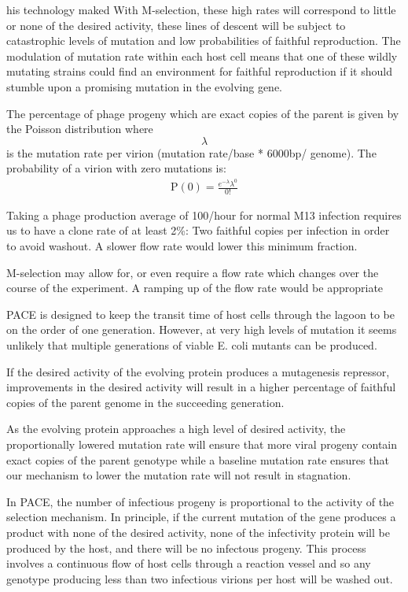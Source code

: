 \documentclass[10pt,letterpaper]{article}
\begin{document}
his technology maked With M-selection, these high rates will correspond to little or none of the desired activity, these lines of descent will be subject to catastrophic levels of mutation and low probabilities of faithful reproduction. The modulation of mutation rate within each host cell means that one of these wildly mutating strains could find an environment for faithful reproduction if it should stumble upon a promising mutation in the evolving gene.

The percentage of phage progeny which are exact copies of the parent is given by the Poisson distribution where $$\lambda$$ is the mutation rate per virion (mutation rate/base * 6000bp/ genome). The probability of a virion with zero mutations is:
\vskip 0.2cm
\begin{eqnarray}
\label{eq:POC}
\mathrm{P}\left( 0 \right) = \frac{{e^{ - \lambda } \lambda ^0 }}{{0!}}
\end{eqnarray}

Taking a phage production average of 100/hour for normal M13 infection requires us to have a clone rate of at least 2\%: Two faithful copies per infection in order to avoid washout.  A slower flow rate would lower this minimum fraction.

M-selection may allow for, or even require a flow rate which changes over the course of the experiment.  A ramping up of the flow rate would be appropriate

PACE is designed to keep the transit time of host cells through the lagoon to be on the order of one generation.  However, at very high levels of mutation it seems unlikely that multiple generations of viable E. coli mutants can be produced.

If the desired activity of the evolving protein produces a mutagenesis repressor, improvements in the desired activity will result in a higher percentage of faithful copies of the parent genome in the succeeding generation.

As the evolving protein approaches a high level of desired activity, the proportionally lowered mutation rate will ensure that more viral progeny contain exact copies of the parent genotype while a baseline mutation rate ensures that our mechanism to lower the mutation rate will not result in stagnation.

In PACE, the number of infectious progeny is proportional to the activity
of the selection mechanism. In principle, if the current mutation of the gene
produces a product with none of the desired activity, none of the infectivity
protein will be produced by the host, and there will be no infectous progeny.
This process involves a continuous flow of host cells through a reaction vessel
and so any genotype producing less than two infectious virions per host will
be washed out.
\end{document}
